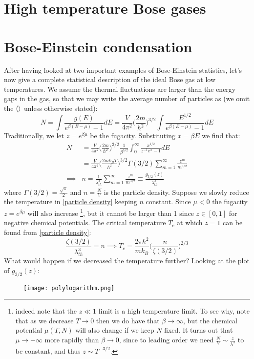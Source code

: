 \documentclass[a4paper,11pt,oneside]{book}
\begin{document}
\section{High temperature Bose gases}
\section{Bose-Einstein condensation}
After having looked at two important examples of Bose-Einstein statistics, let's now give a complete statistical description of the ideal Bose gas at low temperatures. We assume the thermal fluctuations are larger than the energy gaps in the gas, so that we may write the average number of particles as (we omit the $\braket{}$ unless otherwise stated):
\begin{equation}
    N =\int  \frac{g(E)}{e^{\beta(E-\mu)}-1} dE = \frac{V}{4\pi^2}\bigg(\frac{2m}{\hbar^2}\bigg)^{3/2}\int \frac{E^{1/2}}{e^{\beta(E-\mu)}-1} dE 
\end{equation}
Traditionally, we let $z=e^{\beta \mu}$ be the fugacity. Substituting $x=\beta E$ we find that:
\begin{align}
    N &= \frac{V}{4\pi^2}\bigg(\frac{2m}{\hbar^2}\bigg)^{3/2}\frac{1}{\beta^{3/2}}\int_0^\infty \frac{x^{1/2}}{z^{-1}e^x-1} dE\\
    &=\frac{V}{4\pi^2}\bigg(\frac{2mk_B T}{\hbar^2}\bigg)^{3/2} \Gamma(3/2)\sum_{m=1}^\infty \frac{z^m}{m^{3/2}}\\
    \implies & \boxed{n = \frac{1}{\lambda_{th}^3} \sum_{m=1}^\infty \frac{z^m}{m^{3/2}} \equiv \frac{g_{3/2}(z)}{\lambda_{th}^3}} \label{particle density}
\end{align}
where $\Gamma(3/2) = \frac{\sqrt{\pi}}{2}$ and $n=\frac{N}{V}$ is the particle density. Suppose we slowly reduce the temperature in \eqref{particle density} keeping $n$ constant. Since $\mu<0$ the fugacity $z=e^{\beta \mu}$ will also increase \footnote{indeed note that the $z\ll 1$ limit is a high temperature limit. To see why, note that as we decrease $T \rightarrow 0$ then we do have that $\beta \rightarrow \infty$, but the chemical potential $\mu(T,N)$ will also change if we keep $N$ fixed. It turns out that $\mu \rightarrow-\infty$ more rapidly than $\beta \rightarrow 0$, since to leading order we need $\frac{N}{V}\sim \frac{z}{\lambda^3}$ to be constant, and thus $z \sim T^{-3/2}$.}, but it cannot be larger than 1 since $z\in[0,1]$ for negative chemical potentials. The critical temperature $T_c$ at which $z=1$ can be found from \eqref{particle density}:
\begin{equation}
    \frac{\zeta(3/2)}{\lambda_{th}^3} = n \implies \boxed{T_c = \frac{2\pi \hbar^2}{mk_B} \bigg(\frac{n}{\zeta(3/2)}\bigg)^{2/3}}
\end{equation}
What would happen if we decreased the temperature further? Looking at the plot of $g_{3/2}(z)$:
\begin{figure}[h!]
    \centering
    \texttt{[image: polylogarithm.png]}
    \label{fig:my_label}
\end{figure}
\end{document}
